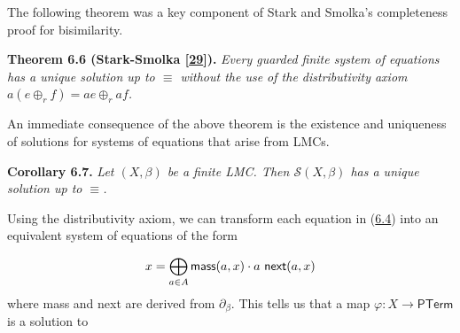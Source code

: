 \par\medskip
\hypertarget{html:S6.SSx1.p2}{} The following theorem was a key component of Stark and Smolka’s completeness proof for bisimilarity.
\par\medskip
\hypertarget{html:S6.Thmtheorem6}{} \par\noindent\textbf{\textbf{Theorem 6.6}\textbf{ }(Stark-Smolka [\hyperlink{html:bib.bib29}{29}])\textbf{.}}\quad  %
\hypertarget{html:S6.Thmtheorem6.p1}{} \emph{Every guarded finite system of equations has a unique solution up to %
\hypertarget{html:S6.Thmtheorem6.p1.m1}{}\({\equiv}\) without the use of the distributivity axiom %
\hypertarget{html:S6.Thmtheorem6.p1.m2}{}\({a(e\oplus_{r}f)=ae\oplus_{r}af}\).}
\par\medskip
\hypertarget{html:S6.SSx1.p3}{} An immediate consequence of the above theorem is the existence and uniqueness of solutions for systems of equations that arise from LMCs.
\par\medskip
\hypertarget{html:S6.Thmtheorem7}{} \par\noindent\textbf{\textbf{Corollary 6.7}\textbf{.}}\quad  %
\hypertarget{html:S6.Thmtheorem7.p1}{} \emph{Let %
\hypertarget{html:S6.Thmtheorem7.p1.m1}{}\({(X,\beta)}\) be a finite LMC. Then %
\hypertarget{html:S6.Thmtheorem7.p1.m2}{}\({\mathcal{S}(X,\beta)}\) has a unique solution up to %
\hypertarget{html:S6.Thmtheorem7.p1.m3}{}\({\equiv}\).}
\par\medskip
\hypertarget{html:S6.SSx1.p4}{} Using the distributivity axiom, we can transform each equation in (\hyperlink{html:S6.E4}{6.4}) into an equivalent system of equations of the form
\par\medskip
\hypertarget{html:S6.Ex3}{}   %
\hypertarget{html:S6.Ex3.m1}{}\[x=\bigoplus_{a\in A}\mbox{\sf mass}(a,x)\cdot a\leavevmode\nobreak\ \mbox{\sf
next}(a,x)\]    where mass and next are derived from %
\hypertarget{html:S6.SSx1.p4.m3}{}\({\partial_{\beta}}\). This tells us that a map %
\hypertarget{html:S6.SSx1.p4.m4}{}\({\varphi\colon X\to\mathsf{PTerm}}\) is a solution to %
